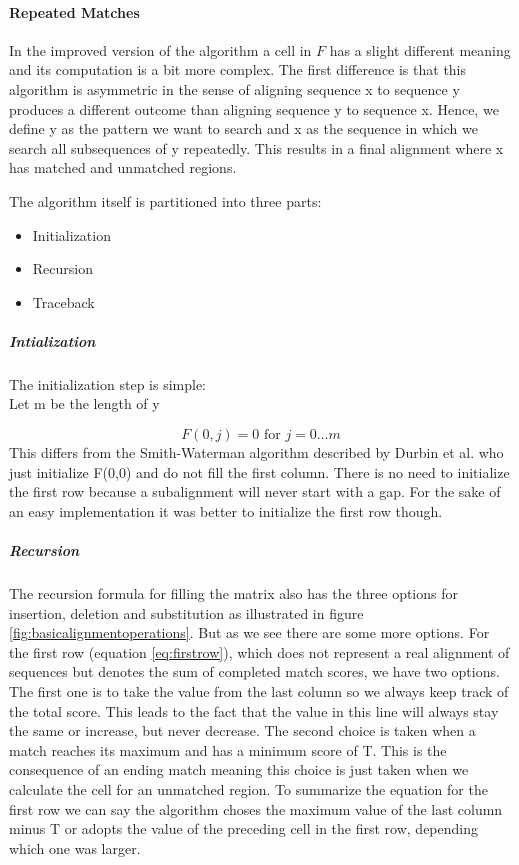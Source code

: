 \paragraph{Repeated Matches}
In the improved version of the algorithm a cell in $F$ has a slight different meaning and its computation is a bit more complex.
The first difference is that this algorithm is asymmetric in the sense of aligning sequence x to sequence y produces a different outcome than aligning sequence y to sequence x.
Hence, we define y as the pattern we want to search and x as the sequence in which we search all subsequences of y repeatedly.
This results in a final alignment where x has matched and unmatched regions.

The algorithm itself is partitioned into three parts:

\begin{itemize}
	\item Initialization
	\item Recursion
	\item Traceback
\end{itemize}

\subparagraph{Intialization}
	The initialization step is simple: \\
	Let m be the length of y

	\begin{equation*}
		F(0,j) = 0 \text{ for } j=0\dotsc m
	\end{equation*}
	This differs from the Smith-Waterman algorithm described by Durbin et al.\cite{durbin1998} who just initialize F(0,0) and do not fill the first column. There is no need to initialize the first row because a subalignment will never start with a gap. For the sake of an easy implementation it was better to initialize the first row though.

\subparagraph{Recursion}
The recursion formula for filling the matrix also has the three options for insertion, deletion and substitution as illustrated in figure \ref{fig:basicalignmentoperations}.
But as we see there are some more options.
For the first row (equation \ref{eq:firstrow}), which does not represent a real alignment of sequences but denotes the sum of completed match scores, we have two options.
The first one is to take the value from the last column so we always keep track of the total score.
This leads to the fact that the value in this line will always stay the same or increase, but never decrease.
The second choice is taken when a match reaches its maximum and has a minimum score of T.
This is the consequence of an ending match meaning this choice is just taken when we calculate the cell for an unmatched region.
To summarize the equation for the first row we can say the algorithm choses the maximum value of the last column minus T or adopts the value of the preceding cell in the first row, depending which one was larger.

